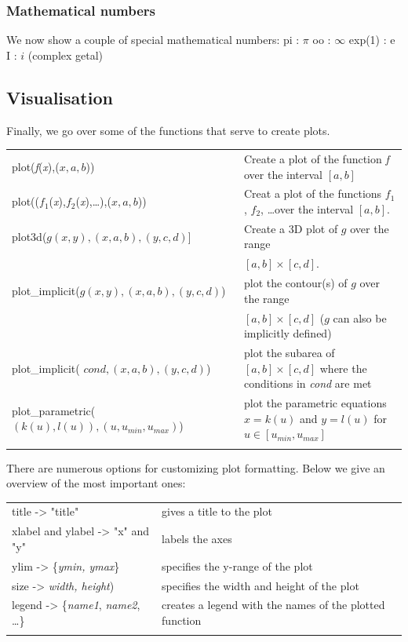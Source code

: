 \subsubsection{Mathematical numbers}
We now show a couple of special mathematical numbers:
pi				:	$\pi$
oo			:	$\infty$
exp(1)			:	e
I				: 	$i$ (complex getal)


\subsection{Visualisation}
Finally, we go over some of the functions that serve to create plots.

\begin{tabular}{>{\hfill}p{8cm}p{9cm}}
	plot(\textit{f}(\textit{x}),($x,a,b$)) 					&	Create a plot of the function \textit{f} over the interval $[a,b]$\\
	
	plot(($f_1$(\textit{x}),$f_2$(\textit{x}),\ldots),($x,a,b$)) 	&	Creat a plot of the functions $f_1$ , $f_2$, \ldots over the interval $[a,b]$.\\
	
	plot3d($g(x, y),(x,a,b),(y,c,d)$]		&	Create a 3D plot of $g$ over the range \\&
	$[a,b]\times[c,d]$.\\
	
	plot\_implicit($g(x, y),(x,a,b),(y,c,d)$)	&	plot the contour(s) of $g$ over the range\\
	& $[a,b]\times[c,d]$ ($g$ can also be implicitly defined)\\
	plot\_implicit( $cond,(x,a,b),(y,c,d)$)	&	plot the subarea of $[a,b]\times[c,d]$ where the conditions in \textit{cond} are met\\
	
	plot\_parametric( $(k(u),l(u)),(u,u_{min},u_{max})$)	&	plot the parametric equations  $x = k(u)$ and $y =l(u)$ for $u\in[u_{min},u_{max}]$\\
	
	\multicolumn{2}{l}{} 
\end{tabular}

There are numerous options for customizing plot formatting.  Below we give an overview of the most important ones:

\begin{tabular}{>{\hfill}p{6.5cm}p{11cm}}
	title  -> "title" 					&	gives a title to the plot\\
	xlabel and ylabel -> "x" and "y"				&	labels the axes\\
	ylim -> \{\textit{ymin, ymax}\}			&	specifies the y-range of the plot\\
	size -> \textit{width, height})				&	specifies the width and height of the plot\\
	legend -> \{\textit{name1},  \textit{name2}, \ldots\}	&	creates a legend with the names of the plotted function\\
	\multicolumn{2}{l}{} 
\end{tabular}


